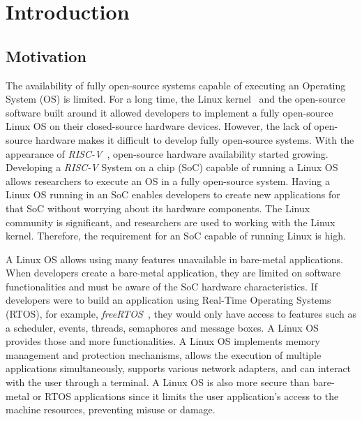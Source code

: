 
\section{Introduction}
\label{sec:intro}

\subsection{Motivation}

The availability of fully open-source systems capable of executing an Operating System (OS) is limited. For a long time, the Linux kernel~\cite{torvalds1997linux} and the open-source software built around it allowed developers to implement a fully open-source Linux OS on their closed-source hardware devices. However, the lack of open-source hardware makes it difficult to develop fully open-source systems. With the appearance of \textit{RISC-V}~\cite{asanovic2014instruction}, open-source hardware availability started growing. Developing a \textit{RISC-V} System on a chip (SoC) capable of running a Linux OS allows researchers to execute an OS in a fully open-source system. Having a Linux OS running in an SoC enables developers to create new applications for that SoC without worrying about its hardware components. The Linux community is significant, and researchers are used to working with the Linux kernel. Therefore, the requirement for an SoC capable of running Linux is high. 

A Linux OS allows using many features unavailable in bare-metal applications. When developers create a bare-metal application, they are limited on software functionalities and must be aware of the SoC hardware characteristics. If developers were to build an application using Real-Time Operating Systems (RTOS), for example, \textit{freeRTOS}~\cite{barry2008freertos}, they would only have access to features such as a scheduler, events, threads, semaphores and message boxes. A Linux OS provides those and more functionalities. A Linux OS implements memory management and protection mechanisms, allows the execution of multiple applications simultaneously, supports various network adapters, and can interact with the user through a terminal. A Linux OS is also more secure than bare-metal or RTOS applications since it limits the user application's access to the machine resources, preventing misuse or damage.


